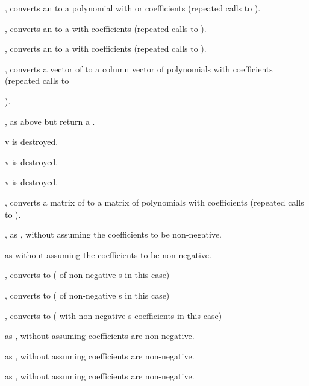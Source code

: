 , converts an  to a polynomial with
 or  coefficients (repeated calls to ).

, converts an  to a  with
 coefficients (repeated calls to ).

, converts an  to a  with
 coefficients (repeated calls to ).

, converts a vector of  to a column
vector of polynomials with  coefficients (repeated calls to

).

, as above but return a .

 v is destroyed.

 v is destroyed.

 v is destroyed.

, converts a matrix of  to a matrix of
polynomials with  coefficients (repeated calls to ).

, as , without assuming
the coefficients to be non-negative.

 as  without assuming
the coefficients to be non-negative.

, converts to  ( of non-negative
s in this case)

, converts to  ( of non-negative
s in this case)

, converts to  ( with
non-negative s coefficients in this case)

 as , without assuming
coefficients are non-negative.

 as , without assuming
coefficients are non-negative.

 as , without assuming
coefficients are non-negative.


